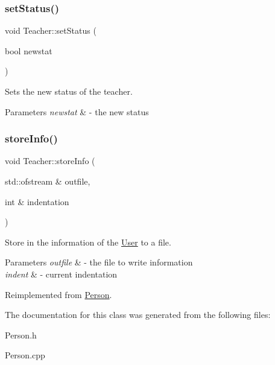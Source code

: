 \subsubsection{\texorpdfstring{set\+Status()}{setStatus()}}
{\footnotesize\ttfamily void Teacher\+::set\+Status (\begin{DoxyParamCaption}\item[{bool}]{newstat }\end{DoxyParamCaption})}



Sets the new status of the teacher. 


\begin{DoxyParams}{Parameters}
{\em newstat} & -\/ the new status \\
\hline
\end{DoxyParams}
\mbox{\label{class_teacher_a2ece0d60fa7ec4aaf93333aa0be0d25f}} 
\subsubsection{\texorpdfstring{store\+Info()}{storeInfo()}}
{\footnotesize\ttfamily void Teacher\+::store\+Info (\begin{DoxyParamCaption}\item[{std\+::ofstream \&}]{outfile,  }\item[{int \&}]{indentation }\end{DoxyParamCaption})\hspace{0.3cm}{\ttfamily [virtual]}}



Store in the information of the \mbox{\hyperlink{class_user}{User}} to a file. 


\begin{DoxyParams}{Parameters}
{\em outfile} & -\/ the file to write information \\
\hline
{\em indent} & -\/ current indentation \\
\hline
\end{DoxyParams}


Reimplemented from \mbox{\hyperlink{class_person_a80f87df3f644706c2ad8fc8b800fdd95}{Person}}.



The documentation for this class was generated from the following files\+:\begin{DoxyCompactItemize}
\item 
Person.\+h\item 
Person.\+cpp\end{DoxyCompactItemize}
